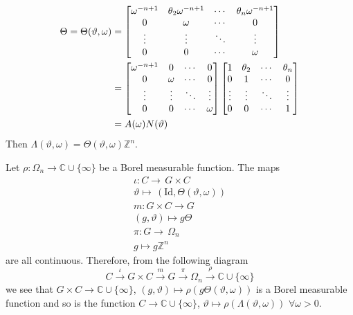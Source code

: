 \documentclass[11pt]{article}
\theoremstyle{definition}
\theoremstyle{proof}
\begin{document}
\begin{equation}
    \begin{split}
        \Theta = \Theta (\vartheta , \omega ) &=
        \renewcommand\arraystretch{1}
        \begin{bmatrix}
            \omega ^{-n+1} & \theta _2 \omega ^{-n+1} & \cdots & \theta _n \omega ^{-n+1} \\
            0              & \omega                   & \cdots & 0 \\
            \vdots         & \vdots                   & \ddots & \vdots \\
            0              & 0                        & \cdots & \omega 
        \end{bmatrix} \\
        &= %
        \renewcommand\arraystretch{1}
        \begin{bmatrix}
            \omega ^{-n+1} & 0       & \cdots  & 0 \\
            0              & \omega  & \cdots  & 0 \\
            \vdots         & \vdots  & \ddots  & \vdots \\
            0              & 0       & \cdots  & \omega 
        \end{bmatrix}
        \renewcommand\arraystretch{1}
        \begin{bmatrix}
            1      & \theta _2 & \cdots  & \theta _n \\
            0      & 1         & \cdots  & 0 \\
            \vdots & \vdots    & \ddots  & \vdots \\
            0      & 0         & \cdots  & 1
        \end{bmatrix} \\
        &= A(\omega ) N(\vartheta )
    \end{split}
\end{equation}
Then $\Lambda (\vartheta , \omega ) = \Theta (\vartheta , \omega )\mathbb{Z}^{n}$.

Let $\rho : {\Omega}_n \to \mathbb{C} \cup \{\infty\}$ be a Borel measurable function.
The maps
\begin{gather*}
    \iota : C \to \, G \times C \\
    \vartheta \mapsto \, (\mathrm{Id}, \Theta (\vartheta, \omega )) \\
    m : G \times C \to  G \\
    (g, \vartheta ) \mapsto g \Theta \\
    \pi : G \to \, {\Omega}_n \\
    g \mapsto g\mathbb{Z}^{n}
\end{gather*}
are all continuous.
Therefore, from the following diagram
\[
    C \xrightarrow{\iota } G \times C \xrightarrow{m} G \xrightarrow{ \pi } {\Omega}_n \xrightarrow{\rho } \mathbb{C} \cup \{\infty\}
\]
we see that $G \times C \to \mathbb{C} \cup \{\infty\}$, $(g,\vartheta ) \mapsto \rho (g \Theta (\vartheta , \omega ))$ is a Borel measurable function and so is the function $C \to \mathbb{C} \cup \{\infty\}$, $\vartheta \mapsto \rho (\Lambda (\vartheta , \omega ))$ $\forall \omega > 0$.
\end{document}
